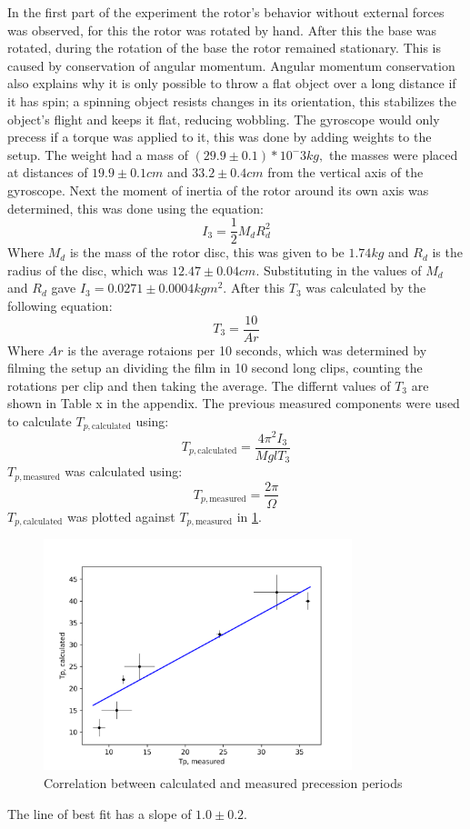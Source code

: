 In the first part of the experiment the rotor’s behavior without external forces was observed, for this the rotor was rotated by hand. After this the base was rotated, during the rotation of the base the rotor remained stationary. This is caused by conservation of angular momentum. Angular momentum conservation also explains why it is only possible to throw a flat object over a long distance if it has spin; a spinning object resists changes in its orientation, this stabilizes the object's flight and keeps it flat, reducing wobbling.
	The gyroscope would only precess if a torque was applied to it, this was done by adding weights to the setup. The weight had a mass of $(29.9 \pm 0.1)*10^-3 kg,$ the masses were placed at distances of $19.9 \pm 0.1 cm$ and $33.2 \pm 0.4 cm$ from the vertical axis of the gyroscope.
	Next the moment of inertia of the rotor around its own axis was determined, this was done using the equation:
\begin{equation*}
    I_3 = \frac{1}{2} M_d R_d^2
\end{equation*}
Where $M_d$ is the mass of the rotor disc, this was given to be $1.74 kg$ and $R_d$ is the radius of the disc, which was $12.47 \pm 0.04 cm$. Substituting in the values of $M_d$ and $R_d$ gave $I_3 = 0.0271 \pm 0.0004 kgm^2$.
    After this $T_3$ was calculated by the following equation:
\begin{equation*}
    T_3 = \frac{10}{Ar}
\end{equation*}
Where $Ar$ is the average rotaions per 10 seconds, which was determined by filming the setup an dividing the film in 10 second long clips, counting the rotations per clip and then taking the average. The differnt values of $T_3$ are shown in Table x in the appendix.
    The previous measured components were used to calculate $T_{p, \text{calculated}}$ using:
\begin{equation*}
    T_{p, \text{calculated}} = \frac{4\pi^2I_3}{MglT_3}
\end{equation*}
$T_{p, \text{measured}}$ was calculated using:
\begin{equation*}
    T_{p, \text{measured}} = \frac{2\pi}{\Omega}
\end{equation*}
$T_{p, \text{calculated}}$ was plotted against $T_{p, \text{measured}}$ in \ref{fig:gyro}.

\begin{figure}[h!]
    \centering
    \includegraphics[width=0.8\textwidth]{gyroscope/images/gyro}
    \caption{Correlation between calculated and measured precession periods}
    \label{fig:gyro}
\end{figure}

The line of best fit has a slope of $1.0 \pm 0.2$.